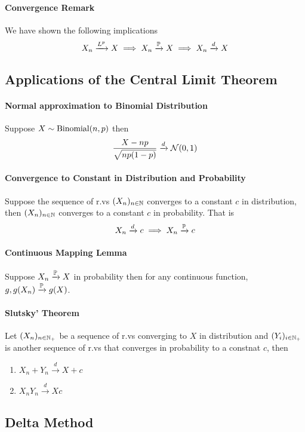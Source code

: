 \paragraph{Convergence Remark}
We have shown the following implications
\[X_n \xrightarrow{L^p} X \implies X_n \xrightarrow{\mathbb{P}} X \implies X_n \xrightarrow{d} X\]

\subsection{Applications of the Central Limit Theorem}
\paragraph{Normal approximation to Binomial Distribution}
Suppose \(X \sim \mathrm{Binomial}(n,p)\) then
\[\frac{X - np}{\sqrt{np(1-p)}} \xrightarrow{d} \mathcal{N}(0,1)\]

\paragraph{Convergence to Constant in Distribution and Probability}
Suppose the sequence of r.vs \((X_n)_{n\in\mathbb{N}}\) converges to a constant \(c\) in distribution, then \((X_n)_{n\in\mathbb{N}}\) converges to a constant \(c\) in probability. That is
\[X_n \xrightarrow{d} c \implies X_n \xrightarrow{\mathbb{P}}c\]

\paragraph{Continuous Mapping Lemma}
Suppose \(X_n \xrightarrow{\mathbb{P}}X\) in probability then for any continuous function, \(g, g(X_n) \xrightarrow{\mathbb{P}}g(X)\).

\paragraph{Slutsky' Theorem}
Let \((X_n)_{n\in\mathbb{N}_+}\) be a sequence of r.vs converging to \(X\) in distribution and \((Y_i)_{i\in\mathbb{N}_+}\) is another sequence of r.vs that converges in probability to a constnat \(c\), then
\begin{enumerate}
    \item \(X_n + Y_n \xrightarrow{d} X + c\)
    \item \(X_nY_n \xrightarrow{d} Xc\)
\end{enumerate}

\subsection{Delta Method}
